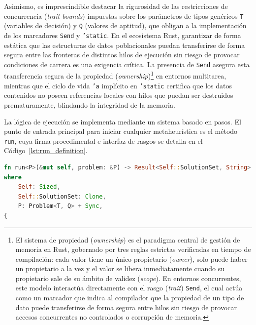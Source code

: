 \documentclass[12pt,a4paper,twoside,openright]{book}
\begin{document}
        Asimismo, es imprescindible destacar la rigurosidad de las restricciones de concurrencia (\textit{trait bounds}) impuestas sobre los parámetros de tipos genéricos \texttt{T} (variables de decisión) y \texttt{Q} (valores de aptitud), que obligan a la implementación de los marcadores \texttt{Send} y \texttt{'static}. En el ecosistema Rust, garantizar de forma estática que las estructuras de datos poblacionales puedan transferirse de forma segura entre las fronteras de distintos hilos de ejecución sin riesgo de provocar condiciones de carrera es una exigencia crítica. La presencia de \texttt{Send} asegura esta transferencia segura de la propiedad (\textit{ownership})\footnote{El sistema de propiedad (\textit{ownership}) es el paradigma central de gestión de memoria en Rust, gobernado por tres reglas estrictas verificadas en tiempo de compilación: cada valor tiene un único propietario (\textit{owner}), solo puede haber un propietario a la vez y el valor se libera inmediatamente cuando su propietario sale de su ámbito de validez (\textit{scope}). En entornos concurrentes, este modelo interactúa directamente con el rasgo (\textit{trait}) \texttt{Send}, el cual actúa como un marcador que indica al compilador que la propiedad de un tipo de dato puede transferirse de forma segura entre hilos sin riesgo de provocar accesos concurrentes no controlados o corrupción de memoria.} en entornos multitarea, mientras que el ciclo de vida \texttt{'a} implícito en \texttt{'static} certifica que los datos contenidos no poseen referencias locales con hilos que puedan ser destruidos prematuramente, blindando la integridad de la memoria.

        La lógica de ejecución se implementa mediante un sistema basado en pasos. El punto de entrada principal para iniciar cualquier metaheurística es el método \texttt{run}, cuya firma procedimental e interfaz de rasgos se detalla en el Código~\ref{lst:run_definition}.

    \noindent
    \begin{samepage}
    \begin{lstlisting}[language=Rust, caption={Definición de la firma genérica del método principal \texttt{run}.}, label={lst:run_definition}]
fn run<P>(&mut self, problem: &P) -> Result<Self::SolutionSet, String>
where
    Self: Sized,
    Self::SolutionSet: Clone,
    P: Problem<T, Q> + Sync,
{
    \end{lstlisting}
    \end{samepage}
    
\end{document}
